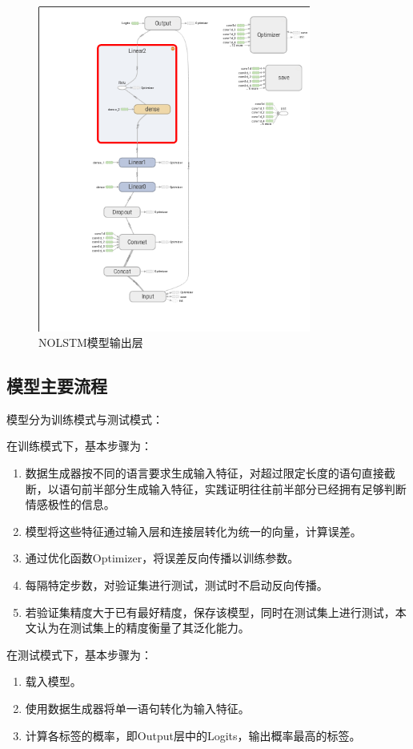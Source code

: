 \begin{figure}[!hbp]
\begin{center}
\includegraphics[width=0.8\textwidth]{graphic/nolstm4.png}
\caption{NOLSTM模型输出层 \label{nolstm3}}
\end{center}
\end{figure}
\subsection{模型主要流程}
模型分为训练模式与测试模式：\par
在训练模式下，基本步骤为：\par
\begin{enumerate}
\item 数据生成器按不同的语言要求生成输入特征，对超过限定长度的语句直接截断，以语句前半部分生成输入特征，实践证明往往前半部分已经拥有足够判断情感极性的信息。
\item 模型将这些特征通过输入层和连接层转化为统一的向量，计算误差。
\item 通过优化函数Optimizer，将误差反向传播以训练参数。
\item 每隔特定步数，对验证集进行测试，测试时不启动反向传播。
\item 若验证集精度大于已有最好精度，保存该模型，同时在测试集上进行测试，本文认为在测试集上的精度衡量了其泛化能力。
\end{enumerate}
在测试模式下，基本步骤为：\par
\begin{enumerate}
\item 载入模型。
\item 使用数据生成器将单一语句转化为输入特征。
\item 计算各标签的概率，即Output层中的Logits，输出概率最高的标签。
\end{enumerate}
